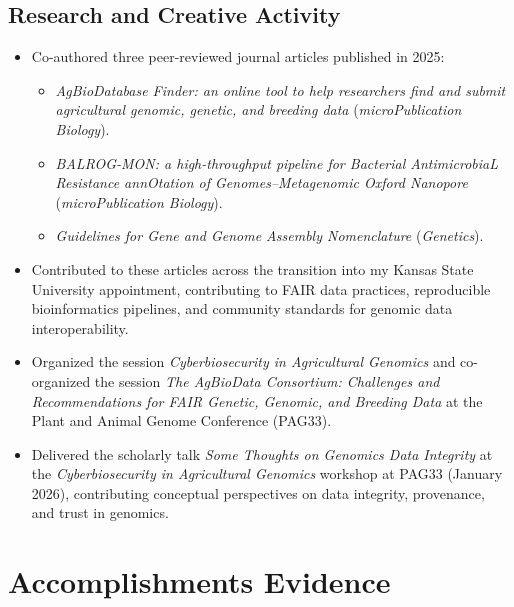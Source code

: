
\subsection*{Research and Creative Activity}

\begin{itemize}
  \item Co-authored three peer-reviewed journal articles published in 2025:
    \begin{itemize}
      \item \textit{AgBioDatabase Finder: an online tool to help researchers find and submit agricultural genomic, genetic, and breeding data} (\textit{microPublication Biology}).
      \item \textit{BALROG-MON: a high-throughput pipeline for Bacterial AntimicrobiaL Resistance annOtation of Genomes--Metagenomic Oxford Nanopore} (\textit{microPublication Biology}).
      \item \textit{Guidelines for Gene and Genome Assembly Nomenclature} (\textit{Genetics}).
    \end{itemize}

  \item Contributed to these articles across the transition into my Kansas State University appointment, contributing to FAIR data practices, reproducible bioinformatics pipelines, and community standards for genomic data interoperability.

  \item Organized the session \textit{Cyberbiosecurity in Agricultural Genomics} and co-organized the session \textit{The AgBioData Consortium: Challenges and Recommendations for FAIR Genetic, Genomic, and Breeding Data} at the Plant and Animal Genome Conference (PAG33).

  \item Delivered the scholarly talk \textit{Some Thoughts on Genomics Data Integrity} at the \textit{Cyberbiosecurity in Agricultural Genomics} workshop at PAG33 (January 2026), contributing conceptual perspectives on data integrity, provenance, and trust in genomics.
\end{itemize}

\section{Accomplishments Evidence}
\printbibliography[keyword={achievements},heading=none]
